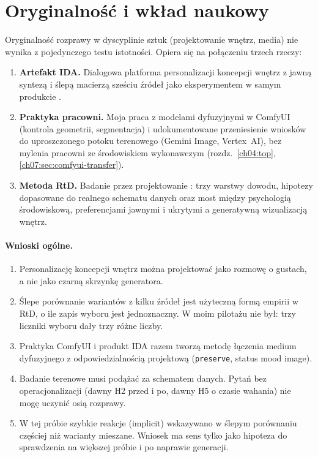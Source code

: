 \section{Oryginalność i wkład naukowy}
\label{ch10:sec:wklad}

Oryginalność rozprawy w dyscyplinie sztuk (projektowanie wnętrz, media) nie wynika z pojedynczego testu istotności. Opiera się na połączeniu trzech rzeczy:

\begin{enumerate}
  \item \textbf{Artefakt IDA.} Dialogowa platforma personalizacji koncepcji wnętrz z jawną syntezą i ślepą macierzą sześciu źródeł jako eksperymentem w samym produkcie \parencite{idaPlatform2026,zimmerman2007rtd}.
  \item \textbf{Praktyka pracowni.} Moja praca z modelami dyfuzyjnymi w ComfyUI (kontrola geometrii, segmentacja) i udokumentowane przeniesienie wniosków do uproszczonego potoku terenowego (Gemini Image, Vertex~AI), bez mylenia pracowni ze środowiskiem wykonawczym (rozdz.~\ref{ch04:top}, \ref{ch07:sec:comfyui-transfer}).
  \item \textbf{Metoda RtD.} Badanie przez projektowanie \parencite{frayling1993research}: trzy warstwy dowodu, hipotezy dopasowane do realnego schematu danych oraz most między psychologią środowiskową, preferencjami jawnymi i ukrytymi a generatywną wizualizacją wnętrz.
\end{enumerate}

\paragraph{Wnioski ogólne.}
\begin{enumerate}
  \item Personalizację koncepcji wnętrz można projektować jako rozmowę o gustach, a nie jako czarną skrzynkę generatora.
  \item Ślepe porównanie wariantów z kilku źródeł jest użyteczną formą empirii w RtD, o ile zapis wyboru jest jednoznaczny. W moim pilotażu nie był: trzy liczniki wyboru dały trzy różne liczby.
  \item Praktyka ComfyUI i produkt IDA razem tworzą metodę łączenia medium dyfuzyjnego z odpowiedzialnością projektową (\texttt{preserve}, status mood image).
  \item Badanie terenowe musi podążać za schematem danych. Pytań bez operacjonalizacji (dawny H2 przed i po, dawny H5 o czasie wahania) nie mogę uczynić osią rozprawy.
  \item W tej próbie szybkie reakcje (implicit) wskazywano w ślepym porównaniu częściej niż warianty mieszane. Wniosek ma sens tylko jako hipoteza do sprawdzenia na większej próbie i po naprawie generacji.
\end{enumerate}

